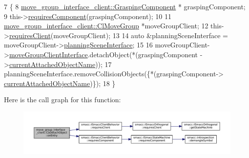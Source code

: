\begin{DoxyCode}
7     \{
8         \hyperlink{classmove__group__interface__client_1_1GraspingComponent}{move\_group\_interface\_client::GraspingComponent} *
      graspingComponent;
9         this->\hyperlink{classsmacc_1_1ISmaccClientBehavior_a19c6d658c8e809bb93bfdc9b639a3ac3}{requiresComponent}(graspingComponent);
10 
11         \hyperlink{classmove__group__interface__client_1_1ClMoveGroup}{move\_group\_interface\_client::ClMoveGroup} *moveGroupClient;
12         this->\hyperlink{classsmacc_1_1ISmaccClientBehavior_a32b16e99e3b4cb289414203dc861a440}{requiresClient}(moveGroupClient);
13 
14         \textcolor{keyword}{auto} &planningSceneInterface = moveGroupClient->\hyperlink{classmove__group__interface__client_1_1ClMoveGroup_a401213ca52233581d2a659dbb772720c}{planningSceneInterface};
15 
16         moveGroupClient->\hyperlink{classmove__group__interface__client_1_1ClMoveGroup_a5f0ea9b52695661b17605691168d1f31}{moveGroupClientInterface}.detachObject(*(graspingComponent
      ->\hyperlink{classmove__group__interface__client_1_1GraspingComponent_aa1098467cb6a739228c3ed1a3f66c095}{currentAttachedObjectName}));
17         planningSceneInterface.removeCollisionObjects(\{*(graspingComponent->
      \hyperlink{classmove__group__interface__client_1_1GraspingComponent_aa1098467cb6a739228c3ed1a3f66c095}{currentAttachedObjectName})\});
18     \}
\end{DoxyCode}
Here is the call graph for this function\+:
\nopagebreak
\begin{figure}[H]
\begin{center}
\leavevmode
\includegraphics[width=350pt]{classmove__group__interface__client_1_1CbDetachObject_aaed049b8c346b38a82acb4641aa90df6_cgraph}
\end{center}
\end{figure}
\mbox{\label{classmove__group__interface__client_1_1CbDetachObject_a43c672ede95c7dc49f98b5b7b623c43f}} 

